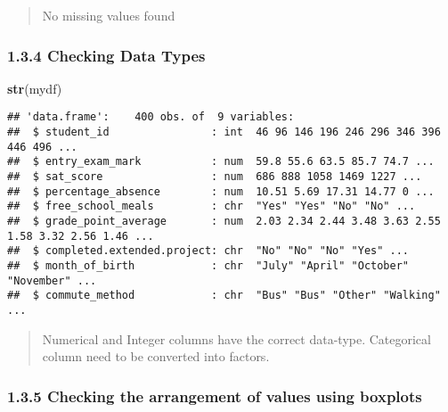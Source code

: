 \documentclass[
]{article}
\newenvironment{Shaded}{\begin{snugshade}}{\end{snugshade}}
\newcommand{\AttributeTok}[1]{\textcolor[rgb]{0.13,0.29,0.53}{#1}}
\newcommand{\CommentTok}[1]{\textcolor[rgb]{0.56,0.35,0.01}{\textit{#1}}}
\newcommand{\FunctionTok}[1]{\textcolor[rgb]{0.13,0.29,0.53}{\textbf{#1}}}
\newcommand{\NormalTok}[1]{#1}
\newcommand{\SpecialCharTok}[1]{\textcolor[rgb]{0.81,0.36,0.00}{\textbf{#1}}}
\newcommand{\StringTok}[1]{\textcolor[rgb]{0.31,0.60,0.02}{#1}}
\begin{document}
\begin{quote}
No missing values found
\end{quote}

\subsubsection{1.3.4 Checking Data Types}\label{checking-data-types}

\begin{Shaded}
\begin{Highlighting}[]
\FunctionTok{str}\NormalTok{(mydf)}
\end{Highlighting}
\end{Shaded}

\begin{verbatim}
## 'data.frame':    400 obs. of  9 variables:
##  $ student_id                : int  46 96 146 196 246 296 346 396 446 496 ...
##  $ entry_exam_mark           : num  59.8 55.6 63.5 85.7 74.7 ...
##  $ sat_score                 : num  686 888 1058 1469 1227 ...
##  $ percentage_absence        : num  10.51 5.69 17.31 14.77 0 ...
##  $ free_school_meals         : chr  "Yes" "Yes" "No" "No" ...
##  $ grade_point_average       : num  2.03 2.34 2.44 3.48 3.63 2.55 1.58 3.32 2.56 1.46 ...
##  $ completed.extended.project: chr  "No" "No" "No" "Yes" ...
##  $ month_of_birth            : chr  "July" "April" "October" "November" ...
##  $ commute_method            : chr  "Bus" "Bus" "Other" "Walking" ...
\end{verbatim}

\begin{quote}
Numerical and Integer columns have the correct data-type. Categorical
column need to be converted into factors.
\end{quote}

\subsubsection{1.3.5 Checking the arrangement of values using
boxplots}\label{checking-the-arrangement-of-values-using-boxplots}

\begin{Shaded}
\end{Shaded}
\end{document}
